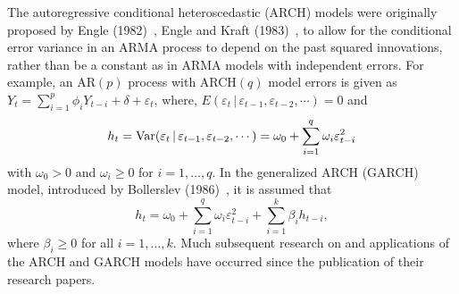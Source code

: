 The autoregressive conditional heteroscedastic (ARCH) models were originally proposed by Engle (1982)~\cite{engle1982}, Engle and Kraft (1983)~\cite{engle1983}, to allow for the conditional error variance in an ARMA process to depend on the past squared innovations, rather than be a constant as in ARMA models with independent errors. For example, an AR$(p)$ process with ARCH$(q)$ model errors is given as $Y_t = \sum_{i=1}^p\phi_iY_{t-i} + \delta + \varepsilon_t$, where, $E(\varepsilon_t\,|\,\varepsilon_{t-1},\varepsilon_{t-2},\cdots)= 0$ and
	\begin{equation}\label{eqn:2ht}
	h_t= \Var(\varepsilon_t \,|\, \varepsilon_{t-1},\varepsilon_{t-2},\cdots) = \omega_0 + \sum_{i=1}^q\omega_i\varepsilon_{t-i}^2
	\end{equation}
with $\omega_0 > 0$ and $\omega_i \geq 0$ for $i= 1,\ldots,q$. In the generalized ARCH (GARCH) model, introduced by Bollerslev (1986)~\cite{bollerslev1986}, it is assumed that
	\begin{equation}\label{eqn:2secondht}
	h_t = \omega_0 + \sum_{i=1}^q\omega_i\varepsilon_{t-i}^2 + \sum_{i=1}^k\beta_ih_{t-i},
	\end{equation}
where $\beta_i \geq 0$ for all $i = 1,\ldots,k$. Much subsequent research on and applications of the ARCH and GARCH models have occurred since the publication of their research papers.


